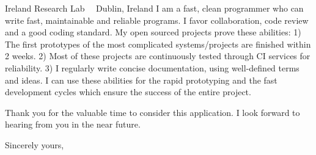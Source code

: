 \documentclass{scrlttr2}
\renewcommand{\\}{\ {\large\textperiodcentered}\ }
\begin{document}
\begin{letter}{ %
Ireland Research Lab\\
Dublin, Ireland
}
I am a fast, clean programmer who can write fast, maintainable and reliable programs.
I favor collaboration, code review and a good coding standard.
My open sourced projects %
 prove these abilities:
1) The first prototypes of the most
 complicated systems/projects are finished within 2 weeks.
2) Most of these projects are continuously tested through CI services
 for reliability.
3) I regularly write concise documentation, using well-defined terms and ideas.
I can use these abilities for the rapid prototyping and the fast development cycles which ensure
 the success of the entire project.




Thank you for the valuable time to consider this application. I look forward to hearing from you in the near future.

Sincerely yours, \\
\end{letter}
\end{document}
